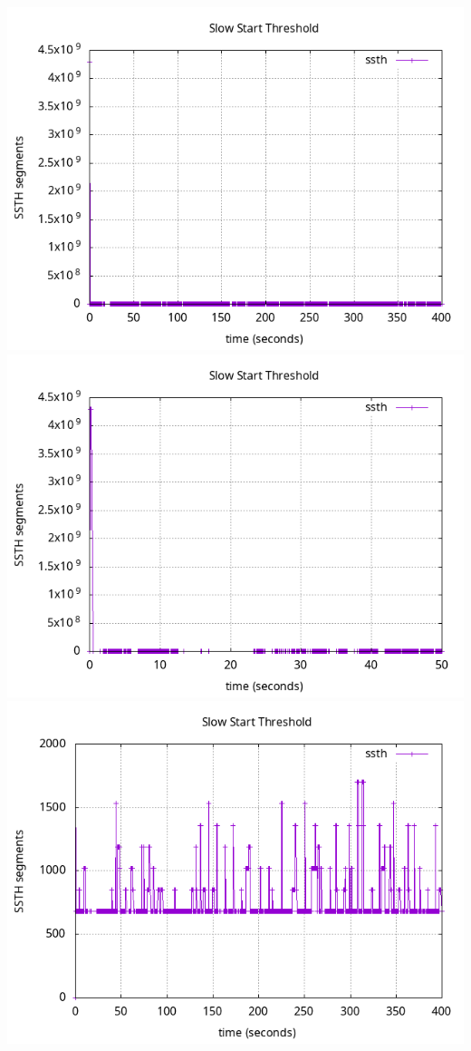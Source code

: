 \documentclass{article}
\begin{document}
\includegraphics[scale=0.5]{plots/lab1-group5-task1-experimentB-question1.1.png}
\includegraphics[scale=0.5]{plots/lab1-group5-task1-experimentB-question1.1-xrange-0-50.png}
\includegraphics[scale=0.5]{plots/lab1-group5-task1-experimentB-question1.1-yrange-0-2000.png}
\end{document}
